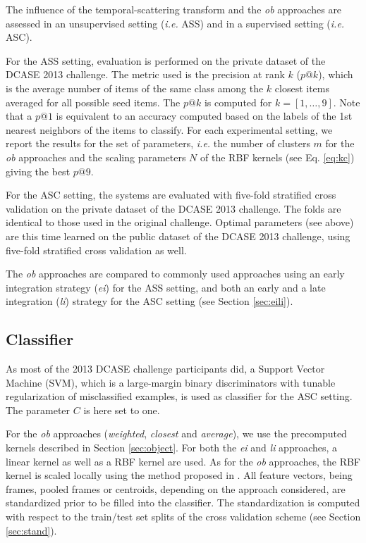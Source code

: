 \documentclass[journal]{IEEEtran}
\begin{document}
The influence of the temporal-scattering transform and the \emph{ob} approaches are assessed in an unsupervised setting (\emph{i.e.} ASS) and in a supervised setting (\emph{i.e.} ASC). 

For the ASS setting, evaluation is performed on the private dataset of the DCASE 2013 challenge. The metric used is the precision at rank $k$ ($p@k$), which is the  average  number  of  items  of  the  same  class among the $k$ closest items averaged for all possible seed items. The $p@k$ is computed for $k=[1,\ldots,9]$. Note that a $p@1$ is equivalent to an accuracy computed based on the labels of the 1st nearest neighbors of the items to classify. For each experimental setting, we report the results for the set of parameters, \emph{i.e.} the number of clusters $m$ for the \emph{ob} approaches and the scaling parameters $N$ of the RBF kernels (see Eq. \ref{eq:kc}) giving the best $p@9$.
 
For the ASC setting, the systems are evaluated  with five-fold  stratified cross validation on the private dataset of the DCASE 2013 challenge. The folds are identical to those used in the original challenge. Optimal parameters (see above) are this time learned on the public dataset of the DCASE 2013 challenge, using five-fold  stratified cross validation as well. 

The \emph{ob} approaches are compared to commonly used approaches using an early integration strategy (\emph{ei}) for the ASS setting, and both an early and a late integration (\emph{li}) strategy for the ASC setting (see Section \ref{sec:eili}). 


\subsection{Classifier}

As most of the 2013 DCASE challenge participants did, a Support Vector Machine (SVM), which is a large-margin binary discriminators with tunable regularization of misclassified examples, is used as classifier for the ASC setting. The parameter $C$ is here set to one.

For the \emph{ob} approaches (\emph{weighted}, \emph{closest} and \emph{average}), we use the precomputed kernels described in Section \ref{sec:object}. For both the \emph{ei} and \emph{li} approaches, a linear kernel as well as a RBF kernel are used. As for the \emph{ob} approaches, the RBF kernel is scaled locally using the method proposed in \cite{selfTuneManor2004}. All feature vectors, being frames, pooled frames or centroids, depending on the approach considered, are standardized prior to be filled into the classifier. The standardization is computed with respect to the train/test set splits of the cross validation scheme (see Section \ref{sec:stand}).
\end{document}

